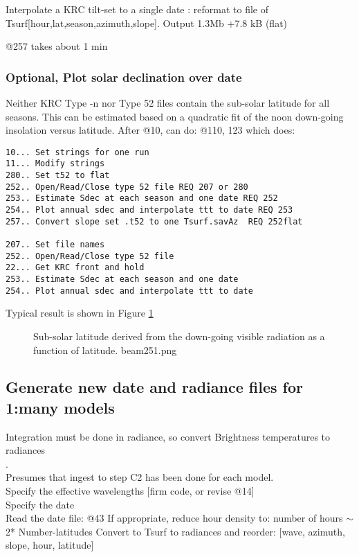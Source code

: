 \documentclass{article}
\begin{document}
Interpolate a KRC tilt-set to a single date : reformat to file of
\qi Tsurf[hour,lat,season,azimuth,slope].  Output 1.3Mb +7.8 kB (flat)

@257 takes about 1 min
\subsubsection{Optional, Plot solar declination over date}

Neither KRC Type -n nor Type 52 files contain the sub-solar latitude for all
seasons.  This can be estimated based on a quadratic fit of the noon down-going
insolation versus latitude. After @10, can do:
\qi @110, 123 which does:
\vspace{-3.mm} 
\begin{verbatim}
10... Set strings for one run
11... Modify strings
280.. Set t52 to flat
252.. Open/Read/Close type 52 file REQ 207 or 280
253.. Estimate Sdec at each season and one date REQ 252
254.. Plot annual sdec and interpolate ttt to date REQ 253
257.. Convert slope set .t52 to one Tsurf.savAz  REQ 252flat

207.. Set file names
252.. Open/Read/Close type 52 file
22... Get KRC front and hold
253.. Estimate Sdec at each season and one date
254.. Plot annual sdec and interpolate ttt to date
\end{verbatim}
Typical result is shown in Figure \ref{beam251}
\begin{figure}[!ht] 
\caption[Estimated sub-Solar Latitude]{Sub-solar latitude derived from the
  down-going visible radiation as a function of latitude.
\label{beam251}  beam251.png }
\end{figure} 

\subsection{Generate new date and radiance files for 1:many models}
Integration must be done in radiance, so convert Brightness temperatures to radiances
\\ .
\\ Presumes that ingest to step C2 has been done for each model.
\\ Specify the effective wavelengths [firm code, or revise @14]
\\ Specify the date
\\ Read the date file: @43
\qii If appropriate, reduce hour density to: number of hours $\sim$ 2* Number-latitudes 
\qi Convert to Tsurf to radiances and reorder: [wave, azimuth, slope, hour, latitude] 
\end{document}
